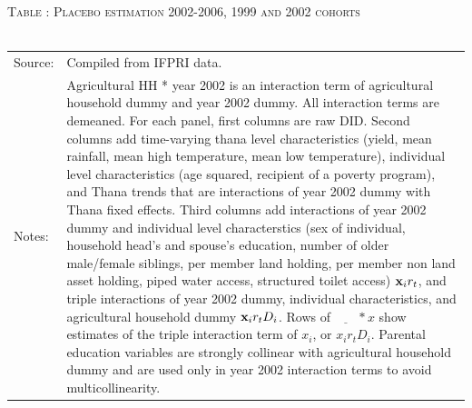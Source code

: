 \documentclass[12pt,letterpaper]{article}
\newcommand{\bfx}{\ensuremath{\mbox{\bf x}}}
\newcommand{\0}{\ensuremath{\mbox{\boldmath $0$}}}
\begin{document}
\begin{table}\hfil\textsc{\footnotesize Table \thetable: Placebo estimation 2002-2006, 1999 and 2002 cohorts\label{Placebo10}}\\\setlength{\tabcolsep}{.5pt}\renewcommand{\arraystretch}{.675}\hspace{-2em}\hfil\\\renewcommand{\arraystretch}{1}\hfil\begin{tabular}{>{\hfill\scriptsize}p{1cm}<{}>{\scriptsize}p{12cm}<{\hfill}} Source:& Compiled from IFPRI data. \\[-1ex] Notes:&   \textsf{Agricultural HH * year 2002} is an interaction term of agricultural household dummy and year 2002 dummy. All interaction terms are demeaned. For each panel, first columns are raw DID. Second columns add time-varying thana level characteristics (yield, mean rainfall, mean high temperature, mean low temperature), individual level characteristics (age squared, recipient of a poverty program), and \textsf{Thana trends} that are interactions of year 2002 dummy with Thana fixed effects. Third columns add interactions of year 2002 dummy and individual level characterstics (sex of individual, household head's and spouse's education, number of older male/female siblings, per member land holding, per member non land asset holding, piped water access, structured toilet access) $\bfx_{i}r_{t}$, and triple interactions of year 2002 dummy, individual characteristics, and agricultural household dummy $\bfx_{i}r_{t}D_{i}$. Rows of $\underline{\phantom{mm}}*x$ show estimates of the triple interaction term of $x_{i}$, or $x_{i}r_{t}D_{i}$. Parental education variables are strongly collinear with agricultural household dummy and are used only in year 2002 interaction terms to avoid multicollinearity.   \end{tabular} \end{table}
\end{document}
